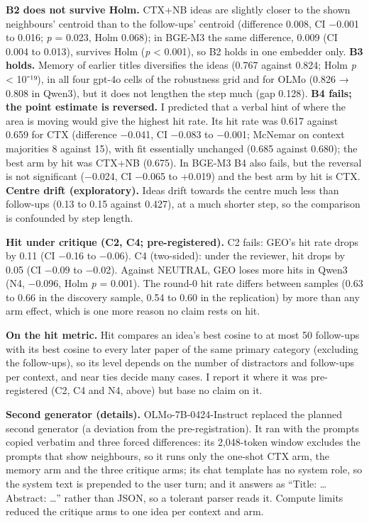 \documentclass[
  10pt,
]{article}
\begin{document}
\textbf{B2 does not survive Holm.}
CTX+NB ideas are slightly closer to the
shown neighbours' centroid than to the
follow-ups' centroid (difference 0.008,
CI −0.001 to 0.016; \emph{p} = 0.023,
Holm 0.068); in BGE-M3 the same
difference, 0.009 (CI 0.004 to 0.013),
survives Holm (\emph{p} \textless{}
0.001), so B2 holds in one embedder
only. \textbf{B3 holds.} Memory of
earlier titles diversifies the ideas
(0.767 against 0.824; Holm \emph{p}
\textless{} 10⁻¹⁹), in all four gpt-4o
cells of the robustness grid and for
OLMo (0.826 → 0.808 in Qwen3), but it
does not lengthen the step much (gap
0.128). \textbf{B4 fails; the point
estimate is reversed.} I predicted that
a verbal hint of where the area is
moving would give the highest hit rate.
Its hit rate was 0.617 against 0.659 for
CTX (difference −0.041, CI −0.083 to
−0.001; McNemar on context majorities 8
against 15), with fit essentially
unchanged (0.685 against 0.680); the
best arm by hit was CTX+NB (0.675). In
BGE-M3 B4 also fails, but the reversal
is not significant (−0.024, CI −0.065 to
+0.019) and the best arm by hit is CTX.
\textbf{Centre drift (exploratory).}
Ideas drift towards the centre much less
than follow-ups (0.13 to 0.15 against
0.427), at a much shorter step, so the
comparison is confounded by step length.

\textbf{Hit under critique (C2, C4;
pre-registered).} C2 fails: GEO's hit
rate drops by 0.11 (CI −0.16 to −0.06).
C4 (two-sided): under the reviewer, hit
drops by 0.05 (CI −0.09 to −0.02).
Against NEUTRAL, GEO loses more hits in
Qwen3 (N4, −0.096, Holm \emph{p} =
0.001). The round-0 hit rate differs
between samples (0.63 to 0.66 in the
discovery sample, 0.54 to 0.60 in the
replication) by more than any arm
effect, which is one more reason no
claim rests on hit.

\textbf{On the hit metric.} Hit compares
an idea's best cosine to at most 50
follow-ups with its best cosine to every
later paper of the same primary category
(excluding the follow-ups), so its level
depends on the number of distractors and
follow-ups per context, and near ties
decide many cases. I report it where it
was pre-registered (C2, C4 and N4,
above) but base no claim on it.

\textbf{Second generator (details).}
OLMo-7B-0424-Instruct replaced the
planned second generator (a deviation
from the pre-registration). It ran with
the prompts copied verbatim and three
forced differences: its 2,048-token
window excludes the prompts that show
neighbours, so it runs only the one-shot
CTX arm, the memory arm and the three
critique arms; its chat template has no
system role, so the system text is
prepended to the user turn; and it
answers as ``Title: \ldots{} Abstract:
\ldots{}'' rather than JSON, so a
tolerant parser reads it. Compute limits
reduced the critique arms to one idea
per context and arm.
\end{document}
